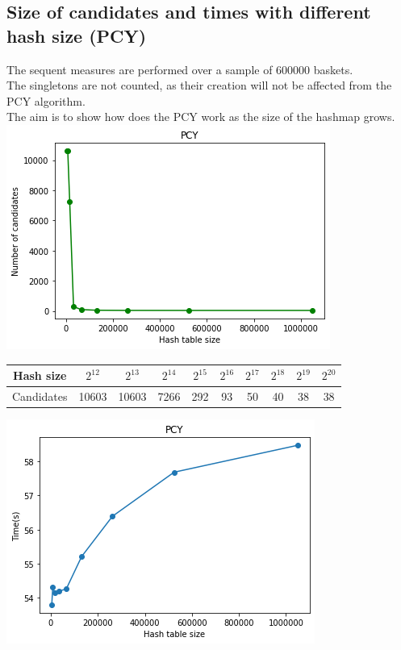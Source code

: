 \documentclass[14pt]{extarticle}
\begin{document}
\subsection{Size of candidates and times with different hash size (PCY)}
The sequent measures are performed over a sample of 600000 baskets.\\
The singletons are not counted, as their creation will not be affected from the PCY algorithm.\\
The aim is to show how does the PCY work as the size of the hashmap grows.\\
\includegraphics[scale=1]{size_by_hsize.png}\\
\begin{center}
\begin{tabular}{ |c||c|c|c|c|c|c|c|c|c| } 
 \hline
 Hash size & $2^{12}$ & $2^{13}$ & $2^{14}$ & $2^{15}$ & $2^{16}$ & $2^{17}$ & $2^{18}$ & $2^{19}$ & $2^{20}$ \\
 \hline
 Candidates & 10603 & 10603 & 7266 & 292 & 93 & 50 & 40 & 38 & 38\\
 \hline
\end{tabular}
\end{center}
\includegraphics[scale=1]{pcy_hsize_time.png}\\
\end{document}
